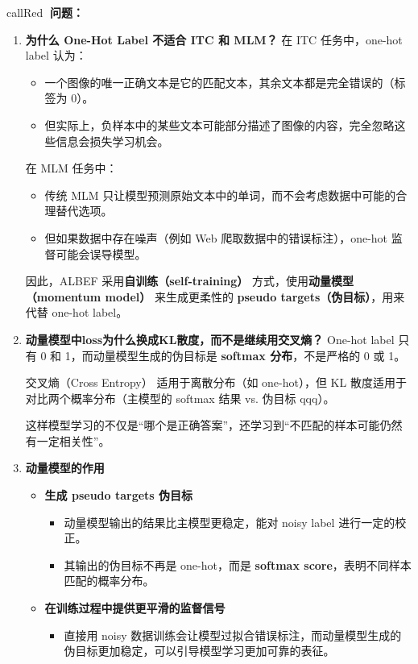 \documentclass[zihao=false,fontset=windows]{ctexart}
\begin{document}
\vspace{0.45em}
\begin{feishubox}{callRed}{🙋}
\textbf{问题：}\par
\begin{enumerate}
\item \textbf{为什么 One-Hot Label 不适合 ITC 和 MLM？}
在 ITC 任务中，one-hot label 认为：\par
\begin{itemize}
\item 一个图像的唯一正确文本是它的匹配文本，其余文本都是完全错误的（标签为 0）。
\item 但实际上，负样本中的某些文本可能部分描述了图像的内容，完全忽略这些信息会损失学习机会。
\end{itemize}
在\textbf{ }MLM 任务中：\par
\begin{itemize}
\item 传统 MLM 只让模型预测原始文本中的单词，而不会考虑数据中可能的合理替代选项。
\item 但如果数据中存在噪声（例如 Web 爬取数据中的错误标注），one-hot 监督可能会误导模型。
\end{itemize}
因此，ALBEF 采用\textbf{自训练（self-training）} 方式，使用\textbf{动量模型（momentum model）} 来生成更柔性的 \textbf{pseudo targets（伪目标）}，用来代替 one-hot label。\par
\item \textbf{动量模型中loss为什么换成KL散度，而不是继续用交叉熵？}
One-hot label 只有 0 和 1，而动量模型生成的伪目标是 \textbf{softmax 分布}，不是严格的 0 或 1。\par
交叉熵（Cross Entropy） 适用于离散分布（如 one-hot），但 KL 散度适用于对比两个概率分布（主模型的 softmax 结果 vs. 伪目标 qqq）。\par
这样模型学习的不仅是“哪个是正确答案”，还学习到“不匹配的样本可能仍然有一定相关性”。\par
\item \textbf{动量模型的作用}
\begin{itemize}
\item \textbf{生成 pseudo targets 伪目标}
\begin{itemize}
\item 动量模型输出的结果比主模型更稳定，能对 noisy label 进行一定的校正。
\item 其输出的伪目标不再是 one-hot，而是 \textbf{softmax score}，表明不同样本匹配的概率分布。
\end{itemize}
\item \textbf{在训练过程中提供更平滑的监督信号}
\begin{itemize}
\item 直接用 noisy 数据训练会让模型过拟合错误标注，而动量模型生成的伪目标更加稳定，可以引导模型学习更加可靠的表征。
\end{itemize}
\end{itemize}
\end{enumerate}
\end{feishubox}
\end{document}
